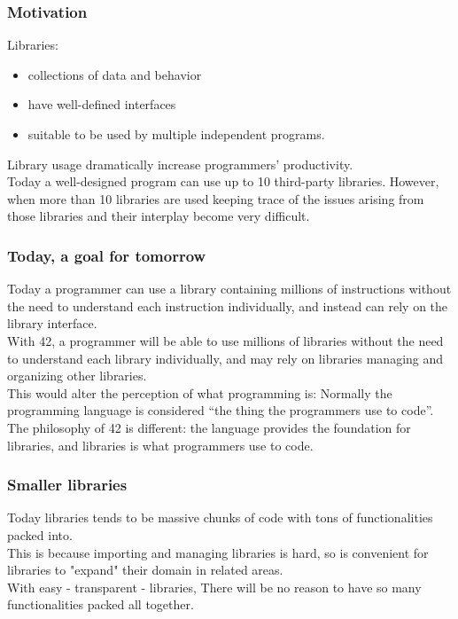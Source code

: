 
\begin{frame}[fragile]
\frametitle{Motivation}

Libraries:
\begin{itemize}
\item collections of data and behavior
\item have well-defined interfaces 
\item suitable to be used by multiple independent programs.
\end{itemize}
${}$\\
  Library usage dramatically increase programmers' productivity.
\\${}$\\
Today a well-designed program can use up to 10 third-party libraries. However, when more than 10 libraries are used keeping trace of the issues arising from those libraries and their interplay become very difficult.
\end{frame}

\begin{frame}[fragile]
\frametitle{Today, a goal for tomorrow}

Today a programmer can use a library containing \alert{millions of instructions} without the need to understand each instruction individually, and instead can rely on the library interface.
\\${}$\\
 With 42, a programmer will be able to use 
 \alert{millions of libraries} without the need to understand each library individually, and may rely on libraries managing and organizing other libraries.
\\${}$\\
This would alter the perception of what programming is: 
Normally the programming language is considered 
``the thing the programmers use to code''.
The philosophy of 42 is different: the language  provides the foundation for libraries, and libraries is what programmers use to code.
 
\end{frame}

\begin{frame}[fragile]
\frametitle{Smaller libraries}

Today libraries tends to be massive chunks of code with
tons of functionalities packed into.
\\${}$\\
This is because importing and managing libraries is hard,
so is convenient for libraries to "expand" their domain
in related areas.
\\${}$\\
With easy - transparent - libraries,
There will be no reason to have so many functionalities packed
all together.
\\${}$\\

\end{frame}


